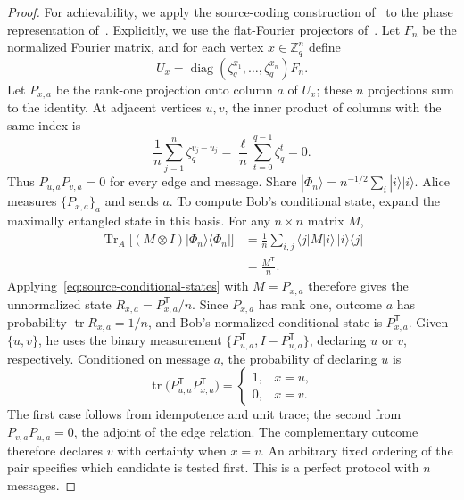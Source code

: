 \documentclass[11pt,a4paper]{article}
\numberwithin{equation}{section}
\numberwithin{figure}{section}
\numberwithin{table}{section}
\numberwithin{footnote}{section}
\theoremstyle{informal}\newtheorem*{informaltheorem}{Informal theorem}
\theoremstyle{definition}\newtheorem{example}{Example}[section]
\theoremstyle{remark}\newtheorem{remark}[theorem]{Remark}
\newcommand{\Z}{\mathbb Z}
\newcommand{\tr}{\operatorname{tr}}
\begin{document}
\begin{proof}
For achievability, we apply the source-coding construction
of~\cite[Lemma~5.1]{bblps} to the phase representation
of~\cite[Lemma~4.1]{cao}. Explicitly, we use the flat-Fourier projectors
of~\cite[Proposition~7]{cmnsw}.
Let \(F_n\) be the normalized Fourier matrix, and for each vertex
\(x\in\Z_q^n\) define
\begin{equation}
 U_x=\operatorname{diag}(\zeta_q^{x_1},\ldots,\zeta_q^{x_n})F_n.
\end{equation}
Let \(P_{x,a}\) be the rank-one projection onto column \(a\) of
\(U_x\); these \(n\) projections sum to the identity.
At adjacent vertices \(u,v\), the inner product of columns with the
same index is
\begin{equation}
 \frac1n\sum_{j=1}^n\zeta_q^{v_j-u_j}
 =\frac{\ell}{n}\sum_{t=0}^{q-1}\zeta_q^t=0.
\end{equation}
Thus \(P_{u,a}P_{v,a}=0\) for every edge and message.
Share \(|\Phi_n\rangle=n^{-1/2}\sum_i|i\rangle|i\rangle\).
Alice measures \(\{P_{x,a}\}_a\) and sends \(a\).
To compute Bob's conditional state, expand the maximally entangled
state in this basis. For any \(n\times n\) matrix \(M\),
\begin{equation}\label{eq:source-maximally-entangled-transpose}
 \begin{aligned}
 \operatorname{Tr}_A\bigl[(M\otimes I)
             |\Phi_n\rangle\langle\Phi_n|\bigr]
 &=\frac1n\sum_{i,j}\langle j|M|i\rangle\,|i\rangle\langle j|\\
 &=\frac{M^{\mathsf T}}n.
 \end{aligned}
\end{equation}
Applying~\eqref{eq:source-conditional-states} with \(M=P_{x,a}\)
therefore gives the unnormalized state
\(R_{x,a}=P_{x,a}^{\mathsf T}/n\).
Since \(P_{x,a}\) has rank one, outcome \(a\) has probability
\(\tr R_{x,a}=1/n\), and Bob's normalized conditional state is
\(P_{x,a}^{\mathsf T}\).
Given \(\{u,v\}\), he uses the binary measurement
\(\{P_{u,a}^{\mathsf T},I-P_{u,a}^{\mathsf T}\}\), declaring
\(u\) or \(v\), respectively. Conditioned on message \(a\),
the probability of declaring \(u\) is
\begin{equation}
 \tr\bigl(P_{u,a}^{\mathsf T}P_{x,a}^{\mathsf T}\bigr)
 =\begin{cases}
  1,&x=u,\\
  0,&x=v.
 \end{cases}
\end{equation}
The first case follows from idempotence and unit trace; the second
from \(P_{v,a}P_{u,a}=0\), the adjoint of the edge relation.
The complementary outcome therefore declares \(v\) with certainty
when \(x=v\).
An arbitrary fixed ordering of the pair specifies which candidate
is tested first. This is a perfect protocol with \(n\) messages.
\end{proof}
\end{document}
